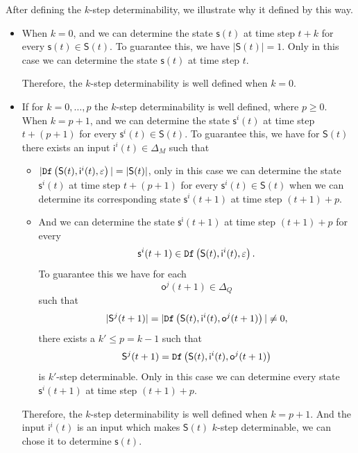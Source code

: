 After defining the $k$-step determinability, we illustrate why it defined by this way.
\begin{itemize}
\item When $k=0$, and we can determine the state $\mathsf{s}(t)$ at time step $t+k$ for every $\mathsf{s}(t)\in \mathsf{S}(t)$. To guarantee this, we have $|\mathsf{S}(t)|=1$. Only in this case we can determine the state $\mathsf{s}(t)$ at time step $t$. 

Therefore, the $k$-step determinability is well defined when $k=0$.

\item  If for $k=0,\ldots, p$ the $k$-step determinability is well defined, where $p\ge 0$. When $k=p+1$, and we can determine the state $\mathsf{s}^{i}(t)$ at time step $t+(p+1)$ for every $\mathsf{s}^{i}(t)\in \mathsf{S}(t)$. To guarantee this, we have for $\mathsf{S}(t)$ there exists an input $\mathsf{i}^{i}(t) \in \Delta_M$ such that
\begin{itemize}
\item $|{\tt Df}\left(\mathsf{S}(t),\mathsf{i}^{i}(t),\varepsilon\right)|=|\mathsf{S}(t)|$, only in this case we can determine the state $\mathsf{s}^{i}(t)$ at time step $t+(p+1)$ for every $\mathsf{s}^{i}(t)\in \mathsf{S}(t)$ when we can determine its corresponding state $\mathsf{s}^{i}(t+1)$ at time step $(t+1)+p$.
\item And we can determine the state $\mathsf{s^{i}}(t+1)$ at time step $(t+1)+p$ for every \[\mathsf{s}^{i}(t+1)\in {\tt Df}\left(\mathsf{S}(t),\mathsf{i}^{i}(t),\varepsilon\right).\] To guarantee this we have for each \[\mathsf{o}^{j}(t+1)\in \Delta_Q\] such that \[|\mathsf{S}^{j}(t+1)|=|{\tt Df}\left(\mathsf{S}(t),\mathsf{i}^{i}(t),\mathsf{o}^{j}(t+1)\right)|\neq 0,\] there exists a ${k'}\le p=k-1$ such that \[\mathsf{S}^{j}(t+1)={\tt Df}\left(\mathsf{S}(t),\mathsf{i}^{i}(t),\mathsf{o}^{j}(t+1)\right)\] is $k'$-step determinable. Only in this case we can determine every state $\mathsf{s}^{i}(t+1)$ at time step $(t+1)+p$.
 \end{itemize}
Therefore, the $k$-step determinability is well defined when $k=p+1$. And the input $\mathsf{i}^{i}(t)$ is an input which makes $\mathsf{S}(t)$ $k$-step determinable, we can chose it to determine $\mathsf{s}(t)$.

 \end{itemize}
 
